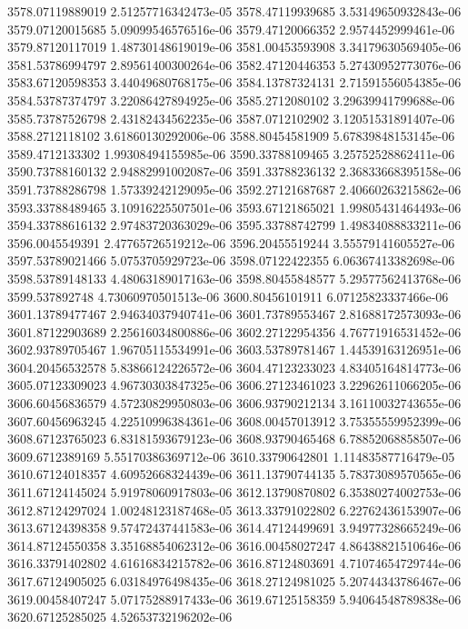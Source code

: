 {3578.07119889019 2.51257716342473e-05
3578.47119939685 3.53149650932843e-06
3579.07120015685 5.09099546576516e-06
3579.47120066352 2.9574452999461e-06
3579.87120117019 1.48730148619019e-06
3581.00453593908 3.34179630569405e-06
3581.53786994797 2.89561400300264e-06
3582.47120446353 5.27430952773076e-06
3583.67120598353 3.44049680768175e-06
3584.13787324131 2.71591556054385e-06
3584.53787374797 3.22086427894925e-06
3585.2712080102 3.29639941799688e-06
3585.73787526798 2.43182434562235e-06
3587.0712102902 3.12051531891407e-06
3588.2712118102 3.61860130292006e-06
3588.80454581909 5.67839848153145e-06
3589.4712133302 1.99308494155985e-06
3590.33788109465 3.25752528862411e-06
3590.73788160132 2.94882991002087e-06
3591.33788236132 2.36833668395158e-06
3591.73788286798 1.57339242129095e-06
3592.27121687687 2.40660263215862e-06
3593.33788489465 3.10916225507501e-06
3593.67121865021 1.99805431464493e-06
3594.33788616132 2.97483720363029e-06
3595.33788742799 1.49834088833211e-06
3596.0045549391 2.47765726519212e-06
3596.20455519244 3.55579141605527e-06
3597.53789021466 5.0753705929723e-06
3598.07122422355 6.06367413382698e-06
3598.53789148133 4.48063189017163e-06
3598.80455848577 5.29577562413768e-06
3599.537892748 4.73060970501513e-06
3600.80456101911 6.07125823337466e-06
3601.13789477467 2.94634037940741e-06
3601.73789553467 2.81688172573093e-06
3601.87122903689 2.25616034800886e-06
3602.27122954356 4.76771916531452e-06
3602.93789705467 1.96705115534991e-06
3603.53789781467 1.44539163126951e-06
3604.20456532578 5.83866124226572e-06
3604.47123233023 4.83405164814773e-06
3605.07123309023 4.96730303847325e-06
3606.27123461023 3.22962611066205e-06
3606.60456836579 4.57230829950803e-06
3606.93790212134 3.16110032743655e-06
3607.60456963245 4.22510996384361e-06
3608.00457013912 3.75355559952399e-06
3608.67123765023 6.83181593679123e-06
3608.93790465468 6.78852068858507e-06
3609.6712389169 5.55170386369712e-06
3610.33790642801 1.11483587716479e-05
3610.67124018357 4.60952668324439e-06
3611.13790744135 5.78373089570565e-06
3611.67124145024 5.91978060917803e-06
3612.13790870802 6.35380274002753e-06
3612.87124297024 1.00248123187468e-05
3613.33791022802 6.22762436153907e-06
3613.67124398358 9.57472437441583e-06
3614.47124499691 3.94977328665249e-06
3614.87124550358 3.35168854062312e-06
3616.00458027247 4.86438821510646e-06
3616.33791402802 4.61616834215782e-06
3616.87124803691 4.71074654729744e-06
3617.67124905025 6.03184976498435e-06
3618.27124981025 5.20744343786467e-06
3619.00458407247 5.07175288917433e-06
3619.67125158359 5.94064548789838e-06
3620.67125285025 4.52653732196202e-06
}

